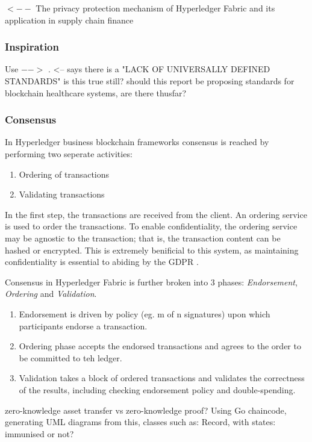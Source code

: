 \cite{ma_privacy_2019} $<--$ The privacy protection mechanism of Hyperledger Fabric and its application in supply chain finance





\subsubsection{Inspiration} %
Use $-->$ \cite{yuan_design_2018}. <-- says there is a "LACK OF UNIVERSALLY DEFINED STANDARDS" is this true still? should this report be proposing standards for blockchain healthcare systems, are there thusfar?

\subsubsection{Consensus}

In Hyperledger business blockchain frameworks consensus is reached by performing two seperate activities:
\begin{enumerate}
  \item Ordering of transactions
  \item Validating transactions
\end{enumerate}
In the first step, the transactions are received from the client.
An ordering service is used to order the transactions. 
To enable confidentiality, the ordering service may be agnostic to the transaction; that is, the transaction content can be hashed or encrypted.\cite{noauthor_hyperledger_2017}
This is extremely benificial to this system, as maintaining confidentiality is essential to abiding by the GDPR \cite{noauthor_general_nodate}.

Consensus in Hyperledger Fabric is further broken into 3 phases: \emph{Endorsement}, \emph{Ordering} and \emph{Validation}.
\begin{enumerate}
  \item Endorsement is driven by policy (eg. m of n signatures) upon which participants endorse a transaction. 
  \item Ordering phase accepts the endorsed transactions and agrees to the order to be committed to teh ledger.
  \item Validation takes a block of ordered transactions and validates the correctness of the results, including checking endorsement policy and double-spending.
\end{enumerate}
zero-knowledge asset transfer vs zero-knowledge proof? \linebreak[1]
Using Go chaincode, generating UML diagrams from this, classes such as: Record, with states: immunised or not?


